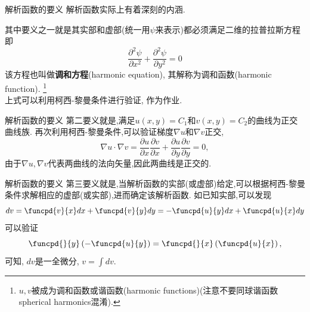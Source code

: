 \documentclass[fontset=windows, chinese, 10pt]{beamer}
\begin{document}
\begin{frame}{解析函数的要义}
解析函数实际上有着深刻的内涵. 

其中要义之一就是其实部和虚部(统一用$\psi$来表示)都必须满足二维的拉普拉斯方程即
 \begin{equation}
    \label{eq:Laplace_eq}
    \frac{\partial^2 \psi}{\partial x^2}+\frac{\partial^2 \psi}{\partial y^2}=0
 \end{equation}
该方程也叫做\textbf{调和方程}(harmonic equation), 其解称为调和函数(harmonic function). 
\footnote{$u,v$被成为调和函数或谐函数(harmonic functions)(注意不要同球谐函数spherical harmonics混淆).}
\\
上式可以利用柯西-黎曼条件进行验证, 作为作业. 

\end{frame}

\begin{frame}{解析函数的要义}
  \small
第二要义就是,满足$u(x,y) = C_1$和$v(x,y)= C_2$的曲线为正交曲线族.
再次利用柯西-黎曼条件,可以验证梯度$\nabla u $和$\nabla v$正交,
\begin{equation}
    \nabla u \cdot \nabla v = \frac{\partial u}{\partial x} 
    \frac{\partial v}{\partial x}+\frac{\partial u}{\partial y} \frac{\partial v}{\partial y}=0 ,
\end{equation}
由于$\nabla u, \nabla v$代表两曲线的法向矢量,因此两曲线是正交的.

\begin{figure}
  \centering
    \scalebox{0.8}
  {

  }

\end{figure}
\end{frame}

\begin{frame}{解析函数的要义}
第三要义就是,当解析函数的实部(或虚部)给定,可以根据柯西-黎曼条件求解相应的虚部(或实部),进而确定该解析函数.
如已知实部,可以发现
\begin{equation}
    d v = \funcpd{v}{x} dx + \funcpd{v}{y} dy = -\funcpd{u}{y} dx + \funcpd{u}{x} dy
\end{equation}
可以验证 
$$
\funcpd{}{y} \left( - \funcpd{u}{y} \right) = \funcpd{}{x} \left( \funcpd{u}{x} \right) , 
$$
可知, $dv$是一全微分, $v = \int dv$.
\end{frame}
\end{document}
